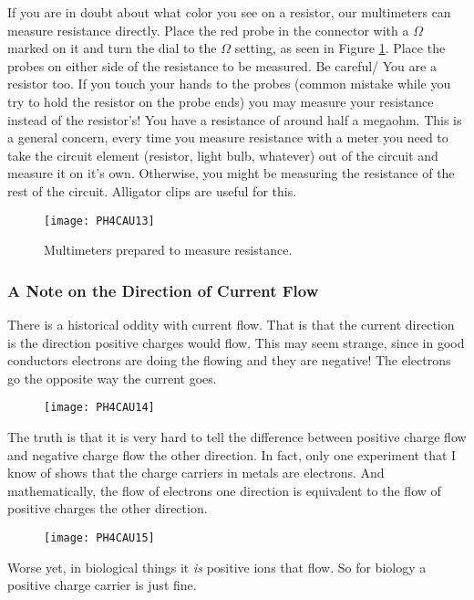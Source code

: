 If you are in doubt about what color you see on a resistor, our multimeters
can measure resistance directly. 
Place the red probe in the
connector with a $\Omega $ marked on it and turn the dial to the $\Omega $
setting, as seen in Figure \ref{fig:multimeter_ohms}.
Place the probes on either side of the resistance to be measured.
Be careful/ You are a resistor too. If you touch your hands to the probes
(common mistake while you try to hold the resistor on the probe ends) you
may measure your resistance instead of the resistor's! You have a resistance
of around half a megaohm. This is a general concern, every time you measure
resistance with a meter you need to take the circuit element (resistor,
light bulb, whatever) out of the circuit and measure it on it's own.
Otherwise, you might be measuring the resistance of the rest of the circuit.
Alligator clips are useful for this.
\begin{figure}[htbp!]
\centering
\texttt{[image: PH4CAU13]}
\caption[Multimeters prepared to measure resistance]{Multimeters prepared
to measure resistance.}
\label{fig:multimeter_ohms}
\end{figure}

\subsubsection{A Note on the Direction of Current Flow}


There is a historical oddity with current flow. That is that the current
direction is the direction positive charges would flow. This may seem
strange, since in good conductors electrons are doing the flowing and they
are negative! The electrons go the opposite way the current goes. \begin{figure}[h!]
\texttt{[image: PH4CAU14]}
\end{figure}%
The truth is that it is very hard to tell the difference between positive
charge flow and negative charge flow the other direction. In fact, only one
experiment that I know of shows that the charge carriers in metals are
electrons. And mathematically, the flow of electrons one direction is
equivalent to the flow of positive charges the other direction.\begin{figure}[h!]
\texttt{[image: PH4CAU15]}
\end{figure}%
Worse yet, in biological things it \emph{is} positive ions that flow. So for
biology a positive charge carrier is just fine.


